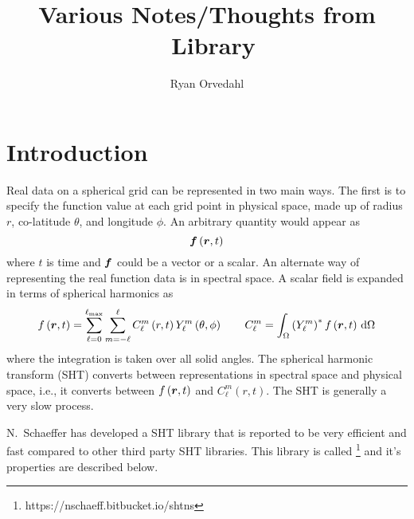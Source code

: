 \documentclass[10pt,letterpaper]{article}
\begin{document}
\title{Various Notes/Thoughts from \shtns\ Library}
\author{Ryan Orvedahl}

\maketitle

\section{Introduction}
Real data on a spherical grid can be represented in two main ways. The first
is to specify the function value at each grid point in physical space,
made up of radius $r$, co-latitude $\theta$, and longitude $\phi$. An arbitrary
quantity would appear as
\begin{equation}
 \bm{f}\left(\bm{r},t\right)
\end{equation}
where $t$ is time and $\bm{f}$ could be a vector or a scalar.
An alternate way of representing the real function data is in spectral space.
A scalar field is expanded in terms of spherical harmonics as
\begin{equation}
 f\left(\bm{r},t\right) = \sum\limits_{\ell=0}^{\ell_\mathrm{max}}
                                 \sum\limits_{m=-\ell}^{\ell}
                C_\ell^m\left(r,t\right) Y_\ell^m\left(\theta,\phi\right)
\qquad
C_\ell^m = \int_\Omega \left(Y_\ell^m\right)^* f\left(\bm{r},t\right)
           \,\mathrm{d}\Omega
\end{equation}
where the integration is taken over all solid angles. The spherical harmonic
transform (SHT) converts between representations in spectral space and
physical space, i.e., it converts between $f\left(\bm{r},t\right)$
and $C_\ell^m\left(r,t\right)$. The SHT is generally a very slow process.

N.~Schaeffer has developed a SHT library that is reported to be very efficient
and fast compared to other third party SHT libraries. This library is called
\shtns\footnote{https://nschaeff.bitbucket.io/shtns} and it's properties are
described below.
\end{document}
